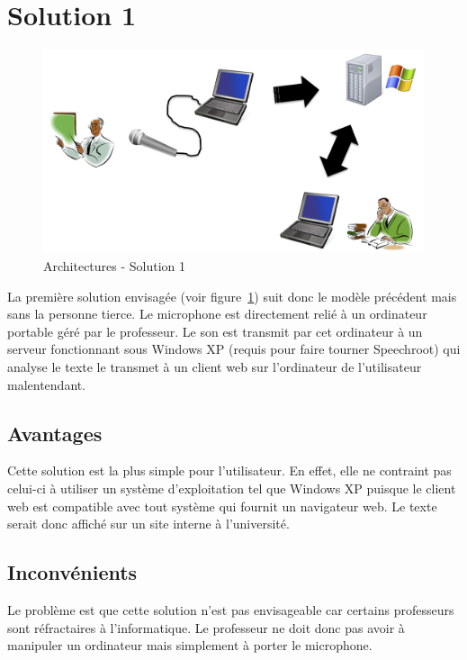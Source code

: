 \section{Solution 1}


\begin{figure}[h]
 \centering
 \includegraphics[scale=0.5]{./img/solution1.png}
 \caption{Architectures - Solution 1}
 \label{fig:solution1}
\end{figure}



La première solution envisagée (voir figure~\ref{fig:solution1}) suit donc le modèle précédent mais sans la personne tierce.
Le microphone est directement relié à un ordinateur portable géré par le professeur.
Le son est transmit par cet ordinateur à un serveur fonctionnant sous Windows XP (requis pour faire tourner Speechroot) qui analyse le texte le transmet à un client web sur l'ordinateur de l'utilisateur malentendant.

\subsection{Avantages}
Cette solution est la plus simple pour l'utilisateur. En effet, elle ne contraint pas celui-ci à utiliser un système d'exploitation tel que Windows XP puisque le client web est compatible avec tout système qui fournit un navigateur web. Le texte serait donc affiché sur un site interne à l'université.

\subsection{Inconvénients}
Le problème est que cette solution n'est pas envisageable car certains professeurs sont ré\-frac\-tai\-res à l'informatique. Le professeur ne doit donc pas avoir à manipuler un ordinateur mais simplement à porter le microphone.


